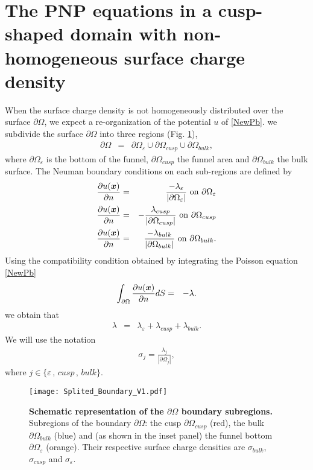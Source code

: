 \documentclass[12pt]{article}
\newcommand{\ds}{\displaystyle}
\newcommand{\beq}{\begin{eqnarray}}
\newcommand{\eeq}{\end{eqnarray}}
\newcommand{\p}{\partial}
\newcommand{\eps}{\varepsilon}
\newcommand{\x}{\mbox{\boldmath$x$}}
\begin{document}
{\section{The PNP equations in a cusp-shaped domain with non-homogeneous surface charge density}\label{s:non_uniform}
When the surface charge density is not homogeneously distributed over the surface $\p\Omega$, we expect a re-organization of the potential $u$ of  \eqref{NewPb}.
we subdivide the surface $\p\Omega$ into three regions (Fig. \ref{f:split_bdv}),
\beq\label{split_surf}
\p\Omega &=&\p\Omega_{\eps}\cup\p\Omega_{cusp}\cup\p\Omega_{bulk},
\eeq
where $\p\Omega_{\eps}$ is the bottom of the funnel, $\p\Omega_{cusp}$ the funnel area and $\p\Omega_{bulk}$ the bulk surface. The Neuman boundary conditions on each sub-regions are defined by
\beq\label{2_BL_conditions}
\frac{\p u(\x)}{\p n}&=& \frac{-\lambda_{\eps} }{|\p\Omega_{\eps}|}\mbox{ on } \p\Omega_{\eps}\\
\frac{\p u(\x)}{\p n}&=& -\frac{ \lambda_{cusp} }{|\p\Omega_{cusp}|}\mbox{ on } \p\Omega_{cusp} \nonumber
\\
\frac{\p u(\x)}{\p n}&=& \frac{ -\lambda_{bulk} }{|\p\Omega_{bulk}|}\mbox{ on } \p\Omega_{bulk}.\nonumber
\eeq
Using the compatibility condition obtained by integrating the Poisson equation \eqref{NewPb}
\beq\label{Compatibility}
\int_{\p\Omega}\frac{\p u(\x) }{\p n}  dS&=& -\lambda.
\eeq
we obtain that
\beq\label{lambda_split}
\lambda&=&\lambda_{\eps}+\lambda_{cusp}+\lambda_{bulk}.
\eeq
We will use the notation
\beq\label{sigma_notation}
\sigma_j=\ds\frac{ \lambda_{j} }{|\p\Omega_{j}|},
\eeq
where $j\in \{ \eps\,,\, cusp\,,\, bulk\}$.
\begin{figure}[H]
	\center
	\texttt{[image: Splited\_Boundary\_V1.pdf]}
	\caption{ {\small  {\bf Schematic representation of the $\p\Omega$ boundary subregions.}
 Subregions of the boundary $\p\Omega$: the cusp $\p\Omega_{cusp}$ (red), the bulk $\p\Omega_{bulk}$ (blue) and (as shown in the inset panel) the funnel bottom $\p\Omega_{\eps}$ (orange). Their respective surface charge densities are $\sigma_{bulk}$, $\sigma_{cusp}$ and $\sigma_{\eps}$.
		}\label{f:split_bdv}}
\end{figure}
}
\end{document}
